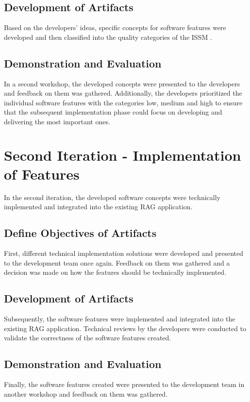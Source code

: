 \documentclass[
	english,
	ruledheaders=section,%
	class=report,%
	thesis={type=bachelor},%
	accentcolor=1b,%
	custommargins=true,%
	marginpar=false,%
	parskip=half-,%
	fontsize=11pt,%
	DIV=14,
]{tudapub}
\begin{document}
\subsection{Development of Artifacts}
Based on the developers' ideas, specific concepts for software features were developed and then classified into the quality categories of the ISSM \parencite{DeloneMcLean2003ISSuccessTenYearUpdate}.
\subsection{Demonstration and Evaluation}
In a second workshop, the developed concepts were presented to the developers and feedback on them was gathered. Additionally, the developers prioritized the individual software features with the categories low, medium and high to ensure that the subsequent implementation phase could focus on developing and delivering the most important ones.
\section{Second Iteration - Implementation of Features}
In the second iteration, the developed software concepts were technically implemented and integrated into the existing RAG application.
\subsection{Define Objectives of Artifacts}
First, different technical implementation solutions were developed and presented to the development team once again. Feedback on them was gathered and a decision was made on how the features should be technically implemented.
\subsection{Development of Artifacts}
Subsequently, the software features were implemented and integrated into the existing RAG application. Technical reviews by the developers were conducted to validate the correctness of the software features created.
\subsection{Demonstration and Evaluation}
Finally, the software features created were presented to the development team in another workshop and feedback on them was gathered.
\end{document}
